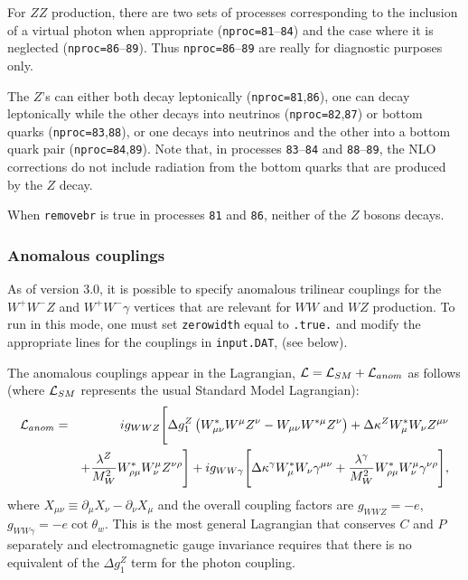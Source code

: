 \documentclass[12pt]{article}
\begin{document}
For $ZZ$ production, there are two sets of processes corresponding to the
inclusion of a virtual photon when appropriate ({\tt nproc=81}--{\tt 84})
and the case where it is neglected ({\tt nproc=86}--{\tt 89}).
Thus {\tt nproc=86}--{\tt 89} are really for diagnostic purposes only.

The $Z$'s can either both decay leptonically ({\tt nproc=81},{\tt 86}),
one can decay leptonically while the other decays into neutrinos
({\tt nproc=82},{\tt 87}) or bottom quarks ({\tt nproc=83},{\tt 88}), or
one decays into neutrinos and the other into a bottom quark pair
({\tt nproc=84},{\tt 89}).
Note that, in processes
{\tt 83}--{\tt 84} and {\tt 88}--{\tt 89}, the NLO corrections do not include
radiation from the bottom quarks that are produced by the $Z$ decay.

When {\tt removebr} is true in processes {\tt 81} and {\tt 86},
neither of the $Z$ bosons decays.

\subsubsection{Anomalous couplings}

As of version 3.0, it is possible to specify anomalous trilinear
couplings for the $W^+W^-Z$ and $W^+W^-\gamma$ vertices that are
relevant for $WW$ and $WZ$ production. To run in this mode, one
must set {\tt zerowidth} equal to {\tt .true.}
and modify the appropriate lines for the couplings in {\tt input.DAT},
(see below).

The anomalous couplings appear in the Lagrangian,
${\cal L} = {\cal L}_{SM} + {\cal L}_{anom}$ as follows
(where ${\cal L}_{SM}$ represents the usual Standard Model Lagrangian):
\begin{eqnarray}
{\cal L}_{anom} & = & i g_{WWZ} \Biggl[
 \Delta g_1^Z \left( W^*_{\mu\nu}W^\mu Z^\nu - W_{\mu\nu}W^{*\mu} Z^\nu \right)
+\Delta\kappa^Z W^*_\mu W_\nu Z^{\mu\nu} \nonumber \\
 & &+
 \frac{\lambda^Z}{M_W^2} W^*_{\rho\mu} W^\mu_\nu Z^{\nu\rho} \Biggr]
+i g_{WW\gamma} \Biggl[ 
 \Delta\kappa^\gamma W^*_\mu W_\nu \gamma^{\mu\nu}
+\frac{\lambda^\gamma}{M_W^2} W^*_{\rho\mu} W^\mu_\nu\gamma^{\nu\rho}
 \Biggr], \nonumber
\end{eqnarray}
where $X_{\mu\nu} \equiv \partial_\mu X_{\nu} - \partial_\nu X_{\mu}$
and the overall coupling factors are $g_{WWZ}=-e$,
$g_{WW\gamma}=-e\cot\theta_w$.
This is the most general Lagrangian that conserves $C$ and $P$
separately and electromagnetic gauge invariance requires that there
is no equivalent of the $\Delta g_1^Z$ term for the photon coupling.
\end{document}
